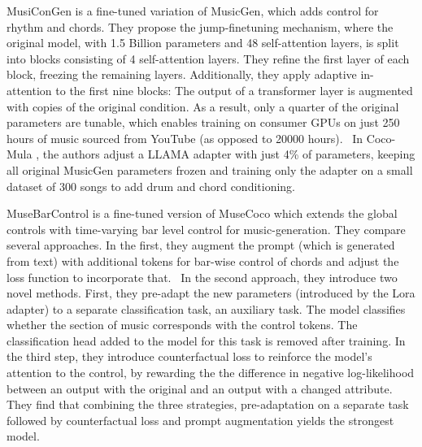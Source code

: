 MusiConGen \cite{Lan_Hsiao_Cheng_Yang_musicongen_2024} is a fine-tuned variation of MusicGen, which adds control for rhythm and chords. They propose the jump-finetuning mechanism, where the original model, with 1.5 Billion parameters and 48 self-attention layers, is split into blocks consisting of 4 self-attention layers. They refine the first layer of each block, freezing the remaining layers. Additionally, they apply adaptive in-attention to the first nine blocks: The output of a transformer layer is augmented with copies of the original condition. As a result, only a quarter of the original parameters are tunable, which enables training on consumer GPUs on just 250 hours of music sourced from YouTube (as opposed to 20000 hours).  In Coco-Mula \cite{Lin_cocomulla_2024}, the authors adjust a LLAMA adapter with just 4\% of parameters, keeping all original MusicGen parameters frozen and training only the adapter on a small dataset of 300 songs to add drum and chord conditioning. 

MuseBarControl \cite{Shu_Xu_Musebarcontrol_2024} is a fine-tuned version of MuseCoco\cite{Lu_Xu_Kang_Yu_Xing_Tan_Bian_MuseCoco_2023} which extends the global controls with time-varying bar level control for music-generation. They compare several approaches. In the first, they augment the prompt (which is generated from text) with additional tokens for bar-wise control of chords and adjust the loss function to incorporate that.  In the second approach, they introduce two novel methods. First, they pre-adapt the new parameters (introduced by the Lora adapter) to a separate classification task, an auxiliary task. The model classifies whether the section of music corresponds with the control tokens. The classification head added to the model for this task is removed after training. In the third step, they introduce counterfactual loss to reinforce the model's attention to the control, by rewarding the the difference in negative log-likelihood between an output with the original and an output with a changed attribute. They find that combining the three strategies, pre-adaptation on a separate task followed by counterfactual loss and prompt augmentation yields the strongest model. 

